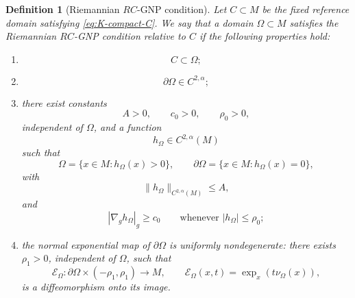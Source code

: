 \documentclass{article}
\newtheorem{definition}[theorem]{Definition}
\newtheorem{remark}[theorem]{Remark}
\begin{document}
\begin{definition}[Riemannian $RC$-GNP condition]
\label{def:RC-GNP}
Let $C\subset M$ be the fixed reference domain satisfying
\eqref{eq:K-compact-C}. We say that a domain $\Omega\subset M$
satisfies the \emph{Riemannian $RC$-GNP condition relative to $C$} if
the following properties hold:

\begin{enumerate}
\item
\begin{equation}
C\subset\Omega;
\label{eq:RCGNP-inclusion}
\end{equation}

\item
\[
\partial\Omega\in C^{2,\alpha};
\]

\item there exist constants
\[
A>0,
\qquad
c_0>0,
\qquad
\rho_0>0,
\]
independent of $\Omega$, and a function
\[
h_\Omega\in C^{2,\alpha}(M)
\]
such that
\begin{equation}
\Omega=\{x\in M:h_\Omega(x)>0\},
\qquad
\partial\Omega=\{x\in M:h_\Omega(x)=0\},
\label{eq:defining-function}
\end{equation}
with
\begin{equation}
\|h_\Omega\|_{C^{2,\alpha}(M)}
\leq A,
\label{eq:uniform-C2alpha}
\end{equation}
and
\begin{equation}
|\nabla_g h_\Omega|_g
\geq c_0
\qquad
\text{whenever }|h_\Omega|\leq\rho_0;
\label{eq:uniform-gradient}
\end{equation}

\item the normal exponential map of $\partial\Omega$ is uniformly
nondegenerate: there exists $\rho_1>0$, independent of $\Omega$, such
that
\begin{equation}
\mathcal E_\Omega:
\partial\Omega\times(-\rho_1,\rho_1)
\longrightarrow M,
\qquad
\mathcal E_\Omega(x,t)
=
\exp_x(t\nu_\Omega(x)),
\label{eq:normal-exp-Omega}
\end{equation}
is a diffeomorphism onto its image.
\end{enumerate}
\end{definition}

\end{document}
